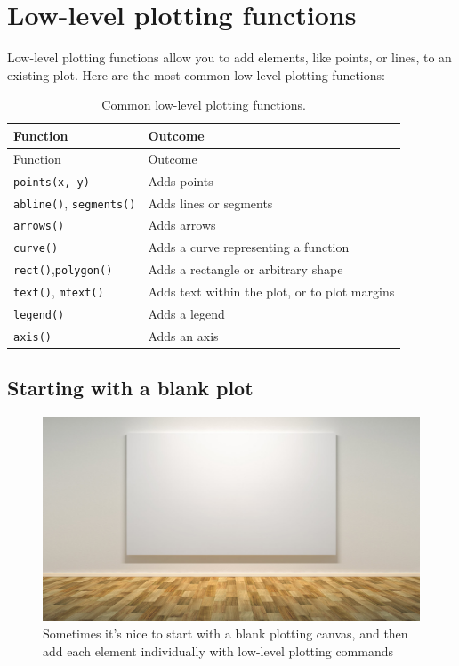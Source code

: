 \documentclass[]{book}
\theoremstyle{definition}
\theoremstyle{definition}
\theoremstyle{remark}
\begin{document}
\section{Low-level plotting
functions}\label{low-level-plotting-functions}

Low-level plotting functions allow you to add elements, like points, or
lines, to an existing plot. Here are the most common low-level plotting
functions:

\begin{longtable}[]{@{}ll@{}}
\caption{\label{tab:lowlevelplotting} Common low-level plotting
functions.}\tabularnewline
\toprule
Function & Outcome\tabularnewline
\midrule
\endfirsthead
\toprule
Function & Outcome\tabularnewline
\midrule
\endhead
\texttt{points(x,\ y)} & Adds points\tabularnewline
\texttt{abline()}, \texttt{segments()} & Adds lines or
segments\tabularnewline
\texttt{arrows()} & Adds arrows\tabularnewline
\texttt{curve()} & Adds a curve representing a function\tabularnewline
\texttt{rect()},\texttt{polygon()} & Adds a rectangle or arbitrary
shape\tabularnewline
\texttt{text()}, \texttt{mtext()} & Adds text within the plot, or to
plot margins\tabularnewline
\texttt{legend()} & Adds a legend\tabularnewline
\texttt{axis()} & Adds an axis\tabularnewline
\bottomrule
\end{longtable}

\subsection{Starting with a blank
plot}\label{starting-with-a-blank-plot}

\begin{figure}

{\centering \includegraphics[width=0.75\linewidth]{images/canvas} 

}

\caption{Sometimes it's nice to start with a blank plotting canvas, and then add each element individually with low-level plotting commands}\label{fig:canvas}
\end{figure}
\end{document}
